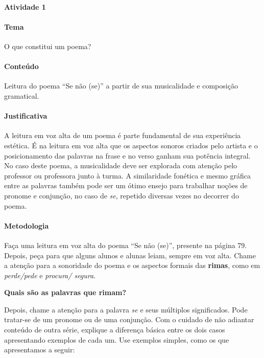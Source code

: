 \documentclass[11pt]{extarticle}
\begin{document}

\paragraph{Atividade 1}

\paragraph{Tema} O que constitui um poema?

\paragraph{Conteúdo} Leitura do poema ``Se não (se)'' a partir de sua musicalidade e 
composição gramatical.

\paragraph{Justificativa} A leitura em voz alta de um poema é 
parte fundamental de sua experiência estética. 
É na leitura em voz alta que os aspectos sonoros
criados pelo artista e o posicionamento das
palavras na frase e no verso ganham sua potência integral. 
No caso deste poema, a musicalidade deve ser explorada com atenção pelo professor ou professora 
junto à turma. 
A similaridade fonética e mesmo gráfica entre 
as palavras também pode ser um ótimo ensejo
para trabalhar noções de pronome e conjunção, no caso 
de \textit{se}, repetido diversas vezes no 
decorrer do poema.

\paragraph{Metodologia} Faça uma leitura em voz alta do poema 
``Se não (se)'', presente na página 79. 
Depois, peça para que alguns alunos e alunas leiam, 
sempre em voz alta.
Chame a atenção para a sonoridade do poema e os aspectos formais
das \textbf{rimas}, como em \textit{perde/pede} e \textit{procura/ segura}.

\textbf{Quais são as palavras que rimam?}


Depois, chame a atenção para a palavra \textit{se} e seus múltiplos significados.
Pode tratar-se de um pronome ou de uma conjunção. 
Com o cuidado de não adiantar conteúdo de outra série,
explique a diferença básica entre os dois casos 
apresentando exemplos de cada um. Use exemplos simples, como os que apresentamos a seguir:
\end{document}
